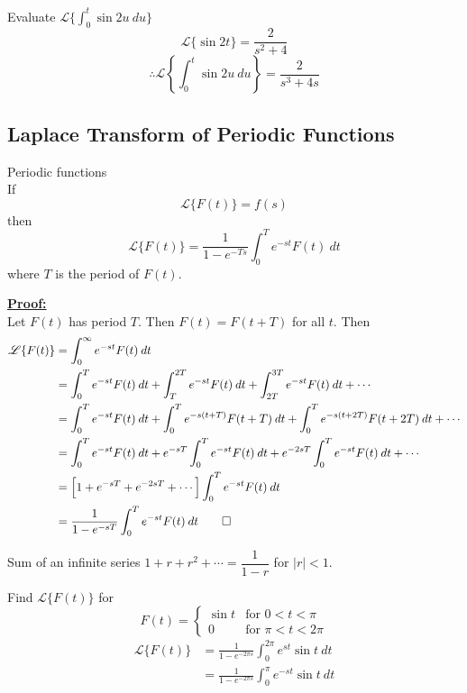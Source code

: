 \documentclass[12pt]{article}
\newcommand{\Lap}{\mathscr{L}}
\begin{document}
\begin{example}{Evaluate $\Lap \{ \int_{0}^{t} {\sin{2u}} \: d{u} \}$}{}
    \[ \Lap \{ \sin{2t} \} = \frac{2}{s^2+4} \]
    \[ \therefore \Lap \left\{ \int_{0}^{t} {\sin{2u}} \: d{u} \right\} = \frac{2}{s^3 + 4s} \]
\end{example}

\subsection{Laplace Transform of Periodic Functions}
\begin{theorem}{Periodic functions}{}
    \\If \[
        \Lap \{ F(t) \} = f(s)
    \] then \[
        \Lap \{ F(t) \} = \frac{1}{1-e^{-Ts}} \int_{0}^{T} {e^{-st}F(t)} \: d{t}
    \] where $T$ is the period of $F(t)$.
\end{theorem}

\underline{\textbf{Proof: }} \\
Let $F(t)$ has period $T$. Then $F(t) = F(t+T)$ for all $t$. Then
\begin{align*}
    \Lap \{ F(t) \} &= \int_{0}^{\infty} {e^{-st}F(t)} \: d{t} \\
    &= \int_{0}^{T} {e^{-st}F(t)} \: d{t} + \int_{T}^{2T} {e^{-st}F(t)} \: d{t} + \int_{2T}^{3T} {e^{-st}F(t)} \: d{t} + \cdots \\
    &= \int_{0}^{T} {e^{-st}F(t)} \: d{t} + \int_{0}^{T} {e^{-s(t+T)}F(t+T)} \: d{t} + \int_{0}^{T} {e^{-s(t+2T)}F(t+2T)} \: d{t} + \cdots \\
    &= \int_{0}^{T} {e^{-st}F(t)} \: d{t} + e^{-sT} \int_{0}^{T} {e^{-st}F(t)} \: d{t} + e^{-2sT} \int_{0}^{T} {e^{-st}F(t)} \: d{t} + \cdots \\
    &= \left[ 1 + e^{-sT} + e^{-2sT} + \cdots \right] \int_{0}^{T} {e^{-st}F(t)} \: d{t} \\
    &= \frac{1}{1-e^{-sT}} \int_{0}^{T} {e^{-st}F(t)} \: d{t} \qed
\end{align*}
\begin{note}{}
    Sum of an infinite series $1 + r + r^2 + \cdots = \dfrac{1}{1-r}$ for $|r|<1$.
\end{note}

\begin{example}{
        Find $\Lap \{ F(t) \}$ for \[
            F(t) = 
            \begin{cases}
                \sin{t} & \text{for } 0 < t < \pi \\
                0 & \text{for } \pi < t < 2\pi
            \end{cases}
        \]
    }{}
    \begin{align*}
        \Lap \{ F(t) \} &= \frac{1}{1 - e^{-2\pi s}} \int_{0}^{2\pi} { e^{st} \sin{t} } \: d{t} \\
        &= \frac{1}{1-e^{-2\pi s}} \int_{0}^{\pi} {e^{-st} \sin{t}} \: d{t}
    \end{align*}
\end{example}
\end{document}
